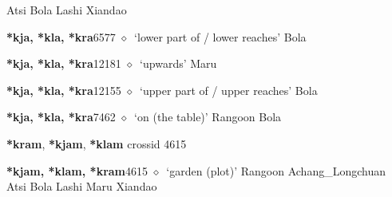 \begin{list}{}{\leftmargin=1.5em \itemindent=-1.5em}
\hspace{1ex}
         Atsi 
\hspace{1ex}
         Bola 
\hspace{1ex}
         Lashi 
\hspace{1ex}
         Xiandao 
  \item {\footnotesize \textbf{*kja, *kla, *kra}}{\tiny 6577}
\hspace{1ex}
         $\diamond$~`lower part of / lower reaches'
         Bola 
  \item {\footnotesize \textbf{*kja, *kla, *kra}}{\tiny 12181}
\hspace{1ex}
         $\diamond$~`upwards'
         Maru 
  \item {\footnotesize \textbf{*kja, *kla, *kra}}{\tiny 12155}
\hspace{1ex}
         $\diamond$~`upper part of / upper reaches'
         Bola 
  \item {\footnotesize \textbf{*kja, *kla, *kra}}{\tiny 7462}
\hspace{1ex}
         $\diamond$~`on (the table)'
         Rangoon 
\hspace{1ex}
         Bola 
  \end{list}
\item
\textbf{*kram}, \textbf{*kjam}, \textbf{*klam}
  {\tiny crossid 4615}
  \begin{list}{}{\leftmargin=1.5em \itemindent=-1.5em}
  \item {\footnotesize \textbf{*kjam, *klam, *kram}}{\tiny 4615}
         $\diamond$~`garden (plot)'
         Rangoon 
\hspace{1ex}
         Achang\_Longchuan 
\hspace{1ex}
         Atsi 
\hspace{1ex}
         Bola 
\hspace{1ex}
         Lashi 
\hspace{1ex}
         Maru 
\hspace{1ex}
         Xiandao 
  \end{list}
